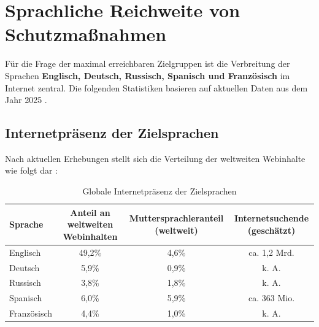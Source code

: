 \documentclass[11pt,a4paper]{article}
\begin{document}
	\section{Sprachliche Reichweite von Schutzmaßnahmen}
	Für die Frage der maximal erreichbaren Zielgruppen ist die Verbreitung der Sprachen \textbf{Englisch, Deutsch, Russisch, Spanisch und Französisch} im Internet zentral. Die folgenden Statistiken basieren auf aktuellen Daten aus dem Jahr 2025 \cite{neil2025,visual2025}.
	
	\subsection{Internetpräsenz der Zielsprachen}
	Nach aktuellen Erhebungen stellt sich die Verteilung der weltweiten Webinhalte wie folgt dar \cite{star2026}:
	
	\begin{table}[ht]
		\centering
		\caption{Globale Internetpräsenz der Zielsprachen}
		\begin{tabular}{@{}lccc@{}}
			\toprule
			Sprache & Anteil an weltweiten Webinhalten & Muttersprachleranteil (weltweit) & Internetsuchende (geschätzt) \\
			\midrule
			Englisch & 49,2\% & 4,6\% & ca. 1,2 Mrd. \\
			Deutsch & 5,9\% & 0,9\% & k. A. \\
			Russisch & 3,8\% & 1,8\% & k. A. \\
			Spanisch & 6,0\% & 5,9\% & ca. 363 Mio. \\
			Französisch & 4,4\% & 1,0\% & k. A. \\
			\bottomrule
		\end{tabular}
	\end{table}
	
\end{document}
